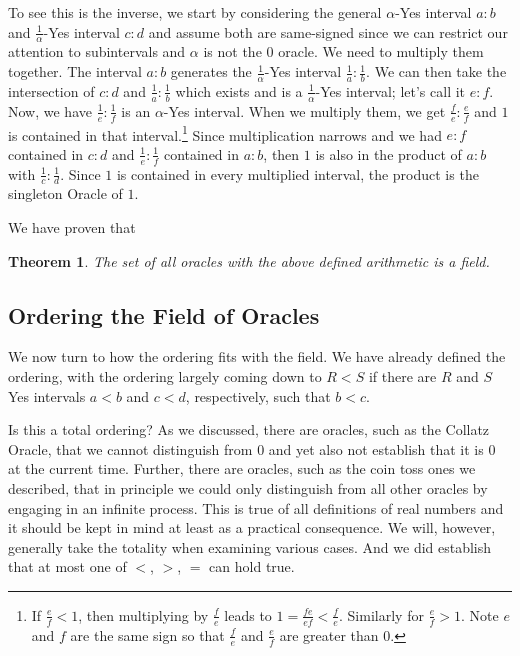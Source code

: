 \documentclass[12pt]{article}
\newtheorem{theorem}{Theorem}
\theoremstyle{remark}
\begin{document}
\begin{itemize}
    To see this is the inverse, we start by considering the general $\alpha$-Yes interval $a:b$ and $\frac{1}{\alpha}$-Yes interval $c:d$ and assume both are same-signed since we can restrict our attention to subintervals and $\alpha$ is not the 0 oracle. We need to multiply them together. The interval $a:b$ generates the $\frac{1}{\alpha}$-Yes interval $\frac{1}{a}:\frac{1}{b}$. We can then take the intersection of $c:d$ and $\frac{1}{a}:\frac{1}{b}$ which exists and is a $\frac{1}{\alpha}$-Yes interval; let's call it $e:f$. Now, we have $\frac{1}{e}:\frac{1}{f}$ is an $\alpha$-Yes interval. When we multiply them, we get $\frac{f}{e}:\frac{e}{f}$ and $1$ is  contained in that interval.\footnote{If $\frac{e}{f} <1$, then multiplying by $\frac{f}{e}$ leads to $1 = \frac{fe}{ef} < \frac{f}{e}$. Similarly for $\frac{e}{f} > 1$. Note $e$ and $f$ are the same sign so that $\frac{f}{e}$ and $\frac{e}{f}$ are greater than 0. } Since multiplication narrows and we had $e:f$ contained in $c:d$ and $\frac{1}{e}:\frac{1}{f}$ contained in $a:b$, then $1$ is also in the product of $a:b$ with $\frac{1}{c}:\frac{1}{d}$. Since $1$ is contained in every multiplied interval, the product is the singleton Oracle of $1$. 
    
\end{itemize}

We have proven that

\begin{theorem}
The set of all oracles with the above defined arithmetic is a field. 
\end{theorem}

\subsection{Ordering the Field of Oracles}

We now turn to how the ordering fits with the field. We have already defined the ordering, with the ordering largely coming down to $R < S$ if there are $R$ and $S$ Yes intervals $a<b$ and $c<d$, respectively, such that $b<c$. 

Is this a total ordering? As we discussed, there are oracles, such as the Collatz Oracle, that we cannot distinguish from 0 and yet also not establish that it is 0 at the current time. Further, there are oracles, such as the coin toss ones we described, that in principle we could only distinguish from all other oracles by engaging in an infinite process. This is true of all definitions of real numbers and it should be kept in mind at least as a practical consequence. We will, however, generally take the totality when examining various cases. And we did establish that at most one of $<$, $>$, $=$ can hold true. 
\end{document}
